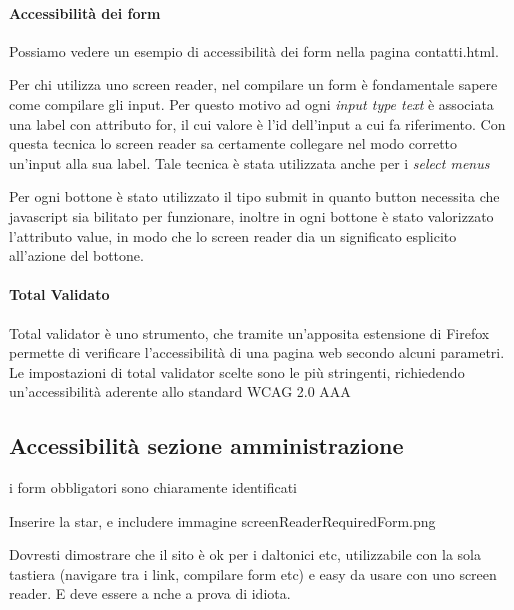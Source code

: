 \paragraph{Accessibilità dei form}

Possiamo vedere un esempio di accessibilità dei form nella pagina contatti.html.

Per chi utilizza uno screen reader, nel compilare un form è fondamentale sapere come compilare gli input. Per questo motivo ad ogni \emph{input type text} è associata una label con attributo for, il cui valore è l'id dell'input a cui fa riferimento. Con questa tecnica lo screen reader sa certamente collegare nel modo corretto un'input alla sua label.
Tale tecnica è stata utilizzata anche per i \emph{select menus}

Per ogni bottone è stato utilizzato il tipo submit in quanto button necessita che javascript sia bilitato per funzionare, inoltre in ogni bottone è stato valorizzato l'attributo value, in modo che lo screen reader dia un significato esplicito all'azione del bottone.

\paragraph{Total Validato}
Total validator è uno strumento, che tramite un'apposita estensione di Firefox permette di verificare l'accessibilità di una pagina web secondo alcuni parametri.
Le impostazioni di total validator scelte sono le più stringenti, richiedendo un'accessibilità aderente allo standard WCAG 2.0 AAA


\subsection{Accessibilità sezione amministrazione}

i form obbligatori sono chiaramente identificati

Inserire la star, e includere immagine screenReaderRequiredForm.png

Dovresti dimostrare che il sito è ok per i daltonici etc, utilizzabile con la sola tastiera (navigare tra i link, compilare form etc) e easy da usare con uno screen reader. E deve essere a nche a prova di idiota.